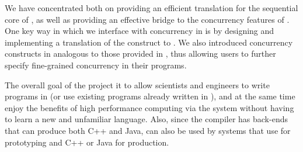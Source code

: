 We have concentrated both on providing an efficient translation for the         
sequential core of \xten, as well as providing an effective bridge to           
the concurrency features of \xten. One key way in which we interface          
with concurrency in \matlab is by designing and implementing a                  
translation of the \matlab \parfor construct to \xten.  We also                 
introduced concurrency constructs in \matlab analogous to those provided        
in \xten, thus allowing users to further specify fine-grained                   
concurrency in their programs.   

The overall goal of the \mixten project it to allow scientists and              
engineers to write programs in \matlab (or use existing programs already        
written in \matlab), and at the same time enjoy the benefits of high            
performance computing via the \xten system without having to learn a new        
and unfamiliar language.   Also, since the \xten compiler has back-ends         
that can produce both C++ and Java,  \mixten can also be used by systems        
that use \matlab for prototyping and C++ or Java for production.  


